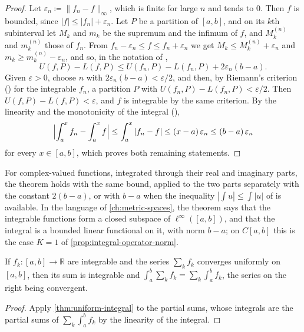 \begin{proof}
Let $\varepsilon_n\coloneqq\|f_n-f\|_\infty$, which is finite for large $n$ and tends to $0$. Then $f$ is bounded, since $|f|\le|f_n|+\varepsilon_n$. Let $P$ be a partition of $[a,b]$, and on its $k$th subinterval let $M_k$ and $m_k$ be the supremum and the infimum of $f$, and $M_k^{(n)}$ and $m_k^{(n)}$ those of $f_n$. From $f_n-\varepsilon_n\le f\le f_n+\varepsilon_n$ we get $M_k\le M_k^{(n)}+\varepsilon_n$ and $m_k\ge m_k^{(n)}-\varepsilon_n$, and so, in the notation of ,
\[
U(f,P)-L(f,P)\le U(f_n,P)-L(f_n,P)+2\varepsilon_n(b-a) .
\]
Given $\varepsilon>0$, choose $n$ with $2\varepsilon_n(b-a)<\varepsilon/2$, and then, by Riemann's criterion () for the integrable $f_n$, a partition $P$ with $U(f_n,P)-L(f_n,P)<\varepsilon/2$. Then $U(f,P)-L(f,P)<\varepsilon$, and $f$ is integrable by the same criterion. By the linearity and the monotonicity of the integral (),
\[
\Bigl|\int_a^xf_n-\int_a^xf\Bigr|\le\int_a^x|f_n-f|\le(x-a)\,\varepsilon_n\le(b-a)\,\varepsilon_n
\]
for every $x\in[a,b]$, which proves both remaining statements.
\end{proof}

For complex-valued functions, integrated through their real and imaginary parts, the theorem holds with the same bound, applied to the two parts separately with the constant $2(b-a)$, or with $b-a$ when the inequality $|\int u|\le\int|u|$ of  is available. In the language of \cref{ch:metric-spaces}, the theorem says that the integrable functions form a closed subspace of $\ell^\infty([a,b])$, and that the integral is a bounded linear functional on it, with norm $b-a$; on $C[a,b]$ this is the case $K=1$ of \cref{prop:integral-operator-norm}.

\begin{corollary}
\label{cor:termwise-integration}
If $f_k\colon[a,b]\to\mathbb R$ are integrable and the series $\sum_kf_k$ converges uniformly on $[a,b]$, then its sum is integrable and $\int_a^b\sum_kf_k=\sum_k\int_a^bf_k$, the series on the right being convergent.
\end{corollary}

\begin{proof}
Apply \cref{thm:uniform-integral} to the partial sums, whose integrals are the partial sums of $\sum_k\int_a^bf_k$ by the linearity of the integral.
\end{proof}

